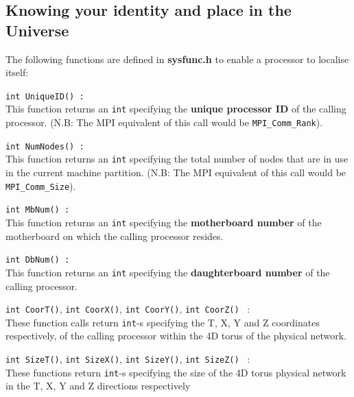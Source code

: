 \subsection{Knowing your identity and place in the Universe}
The following functions are defined in {\bf sysfunc.h} to enable
a processor to localise itself:
\begin{description}
\item{\tt int UniqueID()\ : \\}
This function returns an {\tt int} specifying 
the {\bf unique processor ID} of the calling
processor. (N.B: The MPI equivalent of this call
would be {\tt MPI\_Comm\_Rank}).
\item{\tt int NumNodes()\ : \\}
This function returns an {\tt int} specifying 
the total number of nodes
that are in use in the current machine partition.
(N.B: The MPI equivalent of this call would be {\tt MPI\_Comm\_Size}).
\item{\tt int MbNum()\ : \\}
This function returns an {\tt int} specifying the {\bf motherboard number}
of the motherboard on which the calling processor resides.
\item{\tt int DbNum()\ : \\}
This function returns an {\tt int} specifying the {\bf daughterboard number}
of the calling processor.
\item{{\tt int CoorT()}, {\tt int CoorX()}, {\tt int CoorY()}, {\tt int CoorZ()} \ : \\}
These function calls return {\tt int}-s specifying the T, X, Y and Z coordinates respectively, of the calling processor within the 4D torus of the physical
network.
\item{{\tt int SizeT()}, {\tt int SizeX()}, {\tt int SizeY()}, {\tt int SizeZ()} \ : \\} 
These functions return {\tt int}-s specifying the size of the 4D torus physical
network in the T, X, Y and Z directions respectively
\end{description}

